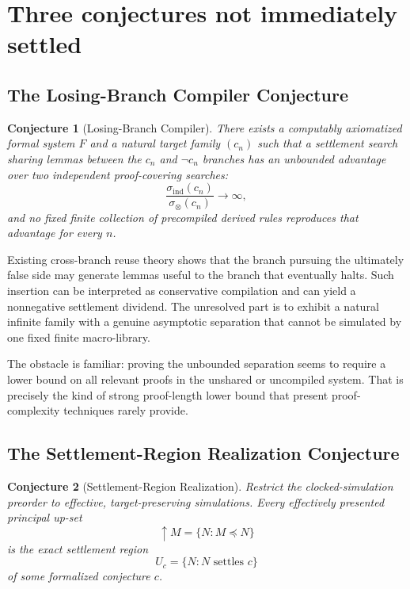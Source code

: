 \documentclass[11pt,letterpaper]{article}
\theoremstyle{named}
\newtheorem{conjecture}{Conjecture}[section]
\begin{document}
\section{Three conjectures not immediately settled}

\subsection{The Losing-Branch Compiler Conjecture}

\begin{conjecture}[Losing-Branch Compiler]
There exists a computably axiomatized formal system $F$ and a natural target family $(c_n)$ such that a settlement search sharing lemmas between the $c_n$ and $\neg c_n$ branches has an unbounded advantage over two independent proof-covering searches:
\[
\frac{\sigma_{\mathrm{ind}}(c_n)}
     {\sigma_{\otimes}(c_n)}
\longrightarrow\infty,
\]
and no fixed finite collection of precompiled derived rules reproduces that advantage for every $n$.
\end{conjecture}

Existing cross-branch reuse theory shows that the branch pursuing the ultimately false side may generate lemmas useful to the branch that eventually halts. Such insertion can be interpreted as conservative compilation and can yield a nonnegative settlement dividend. The unresolved part is to exhibit a natural infinite family with a genuine asymptotic separation that cannot be simulated by one fixed finite macro-library.

The obstacle is familiar: proving the unbounded separation seems to require a lower bound on all relevant proofs in the unshared or uncompiled system. That is precisely the kind of strong proof-length lower bound that present proof-complexity techniques rarely provide.

\subsection{The Settlement-Region Realization Conjecture}

\begin{conjecture}[Settlement-Region Realization]
Restrict the clocked-simulation preorder to effective, target-preserving simulations. Every effectively presented principal up-set
\[
\uparrow M
=
\{N:M\preceq N\}
\]
is the exact settlement region
\[
U_c
=
\{N:N\text{ settles }c\}
\]
of some formalized conjecture $c$.
\end{conjecture}
\end{document}
